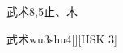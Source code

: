 \begin{entry}{武术}{8,5}{⽌、⽊}
  \begin{phonetics}{武术}{wu3shu4}[][HSK 3]
  \end{phonetics}
\end{entry}
